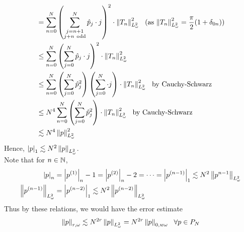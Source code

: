 \documentclass[a4paper,8pt]{article}
\begin{document}
\begin{enumerate}[label=Q\arabic	*.]
\begin{enumerate}[label=(\alph*)]
\begin{align}
&= \sum\limits_{n=0}^N \left(\sum^N_{\substack{j = n+1 \\ j + n \ \text{odd}}} \hat{p}_j \cdot j \right)^2 \cdot \norm{T_n}^2_{L^2_{\omega}} \ \ \text{(as $\norm{T_n}^2_{L^2_{\omega}} = \frac{\pi}{2}(1+\delta_{0n})$)} \nonumber \\
&\leq \sum\limits_{n=0}^N \left(\sum^N_{j = 0} \hat{p}_j \cdot j \right)^2 \cdot \norm{T_n}^2_{L^2_{\omega}} \nonumber \\
&\leq \sum\limits_{n=0}^N \left(\sum^N_{j = 0} \hat{p}^2_j \right) \left(\sum^N_{j = 0} \cdot j \right) \cdot \norm{T_n}^2_{L^2_{\omega}} \ \ \text{by Cauchy-Schwarz} \nonumber \\
&\leq N^4 \sum\limits_{n=0}^N \left(\sum^N_{j = 0} \hat{p}^2_j \right) \cdot \norm{T_n}^2_{L^2_{\omega}} \ \ \text{by Cauchy-Schwarz} \nonumber \\
&\lesssim N^4 \norm{p}^2_{L^2_{\omega}} \nonumber
\end{align}
Hence, $\left\lvert p\right\rvert_1 \lesssim N^2 \left\lVert p\right\rVert_{L^2_{\omega}}$.\\
Note that for $n \in \mathbb{N}$, 
\begin{align}
\left\lvert p\right\rvert_n &= \left\lvert p^{(1)}\right\rvert_n-1 = \left\lvert p^{(2)}\right\rvert_n-2 = \cdots = \left\lvert p^{(n-1)}\right\rvert_1 \lesssim N^2 \left\lVert p^{n-1}\right\rVert_{L^2_{\omega}}  \nonumber \\
\left\lVert p^{(n-1)}\right\rVert_{L^2_{\omega}} &= \left\lvert p^{(n-2)}\right\rvert_1 \lesssim N^2 \left\lVert p^{(n-2)}\right\rVert_{L^2_{\omega}} \nonumber
\end{align}
Thus by these relations, we would have the error estimate
\begin{equation}
\left\lVert p\right\rVert_{r, \omega} \lesssim N^{2r} \left\lVert p\right\rVert_{L^2_{\omega}} = N^{2r} \left\lVert p\right\rVert_{0,w\omega} \ \ \forall p \in P_N \nonumber
\end{equation}
\end{enumerate}
\end{enumerate}
\end{document}
